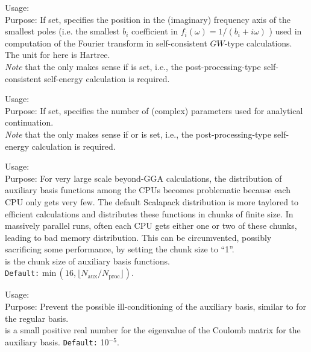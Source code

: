 { \noindent
  Usage:   \\[1.0ex]
  Purpose: If set, specifies the position in the (imaginary) frequency axis of the 
  smallest poles (i.e. the smallest $b_i$ coefficient in $f_i(\omega) = 1/(b_i +i\omega)$ ) 
  used in computation of the Fourier transform in self-consistent $GW$-type calculations. 
   The unit for  here is Hartree. \\[1.0ex]
}
\emph{Note} that the  only makes sense if
 is set, i.e., the post-processing-type self-consistent self-energy calculation
is required.


{ \noindent
  Usage:   \\[1.0ex]
  Purpose: If set, specifies the number of (complex) parameters used for 
   analytical continuation.
}\\[1.0ex]
\emph{Note} that the  only makes sense if 
 or  is set, i.e., the post-processing-type self-energy calculation 
is required.

{ \noindent
  Usage:   \\[1.0ex]
  Purpose: For very large scale beyond-GGA calculations, the distribution of
  auxiliary basis functions among the CPUs becomes problematic because each
  CPU only gets very few.  The default Scalapack distribution is more taylored
  to efficient calculations and distributes these functions in chunks of
  finite size.  In massively parallel runs, often each CPU gets either one or
  two of these chunks, leading to bad memory distribution.  This can be
  circumvented, possibly sacrificing some performance, by setting the chunk
  size  to ``1''.
  \\[1.0ex]  
   is the chunk size of auxiliary basis functions.
  \\
  \texttt{Default:} $\mathrm{min}\,(16,
  \lfloor N_{\mathrm{aux}}/N_{\mathrm{proc}}\rfloor)$.
}

{ \noindent
  Usage:   \\[1.0ex]
  Purpose: Prevent the possible ill-conditioning of the auxiliary basis, similar
  to  for the regular basis.  \\[1.0ex]  
   is a small positive real number for the eigenvalue of the
   Coulomb matrix for the auxiliary basis. \texttt{Default:} 10$^{-5}$. 
}

